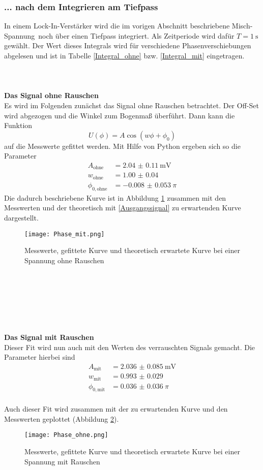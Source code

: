 \subsubsection{... nach dem Integrieren am Tiefpass}\label{nach_Tiefpass}
In einem Lock-In-Verstärker wird die im vorigen Abschnitt beschriebene \glqq Misch-Spannung\grqq\ noch über einen Tiefpass integriert. Als Zeitperiode wird dafür $T = \SI{1}{\second}$ gewählt. Der Wert dieses Integrals wird für verschiedene Phasenverschiebungen abgelesen und ist in Tabelle \ref{Integral_ohne} bzw. \ref{Integral_mit} eingetragen. \\
\ \\
\ \\
\ \\
\textbf{Das Signal ohne Rauschen} \\
Es wird im Folgenden zunächst das Signal ohne Rauschen betrachtet. Der Off-Set wird abgezogen und die Winkel zum Bogenmaß überführt. Dann kann die Funktion
\[U(\phi) = A\cos(w\phi+\phi_0)\]
auf die Messwerte gefittet werden. Mit Hilfe von Python ergeben sich so die Parameter
\begin{align}
	A_\text{ohne} &= \SI{2.04(011)}{\milli\volt} \\
	w_\text{ohne} &= \SI{1.00(004)}{} \\
	\phi_{0,\text{ohne}} &= \SI{-0.008(53)}{\pi}
\end{align}
Die dadurch beschriebene Kurve ist in Abbildung \ref{Fit_ohne} zusammen mit den Messwerten und der theoretisch mit \eqref{Ausgangssignal} zu erwartenden Kurve dargestellt. \\

\begin{figure}[h!]
	\texttt{[image: Phase\_mit.png]}
	\caption{Messwerte, gefittete Kurve und theoretisch erwartete Kurve bei einer Spannung ohne Rauschen}
	\label{Fit_ohne}
\end{figure} \\
\ \\
\ \\
\ \\
\ \\
\ \\
\textbf{Das Signal mit Rauschen} \\
Dieser Fit wird nun auch mit den Werten des verrauschten Signals gemacht. Die Parameter hierbei sind
\begin{align}
	A_\text{mit} &= \SI{2.036(0085)}{\milli\volt} \\
	w_\text{mit} &= \SI{0.993(0029)}{} \\
	\phi_{0,\text{mit}} &= \SI{0.036(0036)}{\pi}
\end{align}
 \\
Auch dieser Fit wird zusammen mit der zu erwartenden Kurve und den Messwerten geplottet (Abbildung \ref{Fit_mit}).
\begin{figure}[h!]
	\texttt{[image: Phase\_ohne.png]}
	\caption{Messwerte, gefittete Kurve und theoretisch erwartete Kurve bei einer Spannung mit Rauschen}
	\label{Fit_mit}
\end{figure}
\clearpage
